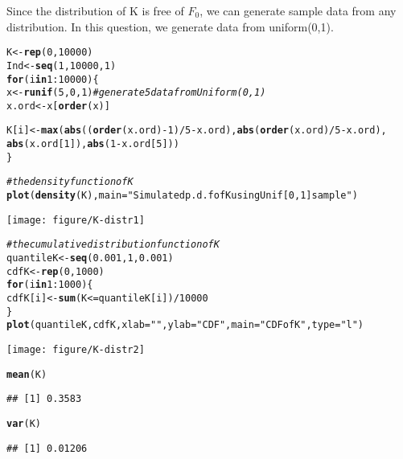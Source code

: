 \documentclass{article}\usepackage[]{graphicx}\usepackage[]{color}
\makeatletter
\newcommand{\hlnum}[1]{\textcolor[rgb]{0.686,0.059,0.569}{#1}}%
\newcommand{\hlstr}[1]{\textcolor[rgb]{0.192,0.494,0.8}{#1}}%
\newcommand{\hlcom}[1]{\textcolor[rgb]{0.678,0.584,0.686}{\textit{#1}}}%
\newcommand{\hlopt}[1]{\textcolor[rgb]{0,0,0}{#1}}%
\newcommand{\hlstd}[1]{\textcolor[rgb]{0.345,0.345,0.345}{#1}}%
\newcommand{\hlkwa}[1]{\textcolor[rgb]{0.161,0.373,0.58}{\textbf{#1}}}%
\newcommand{\hlkwb}[1]{\textcolor[rgb]{0.69,0.353,0.396}{#1}}%
\newcommand{\hlkwc}[1]{\textcolor[rgb]{0.333,0.667,0.333}{#1}}%
\newcommand{\hlkwd}[1]{\textcolor[rgb]{0.737,0.353,0.396}{\textbf{#1}}}%
\newenvironment{kframe}{%
 \def\at@end@of@kframe{}%
 \ifinner\ifhmode%
  \def\at@end@of@kframe{\end{minipage}}%
  \begin{minipage}{\columnwidth}%
 \fi\fi%
 \def\FrameCommand##1{\hskip\@totalleftmargin \hskip-\fboxsep
 \colorbox{shadecolor}{##1}\hskip-\fboxsep
     \hskip-\linewidth \hskip-\@totalleftmargin \hskip\columnwidth}%
 \MakeFramed {\advance\hsize-\width
   \@totalleftmargin\z@ \linewidth\hsize
   \@setminipage}}%
 {\par\unskip\endMakeFramed%
 \at@end@of@kframe}
\newenvironment{knitrout}{}{} %
\makeatother
\begin{document}
Since the distribution of K is free of $F_0$, we can generate sample data from any distribution. In this question, we generate data from uniform(0,1).
\begin{knitrout}
\color{fgcolor}\begin{kframe}
\begin{alltt}
\hlstd{K} \hlkwb{<-} \hlkwd{rep}\hlstd{(}\hlnum{0}\hlstd{,} \hlnum{10000}\hlstd{)}
\hlstd{Ind} \hlkwb{<-} \hlkwd{seq}\hlstd{(}\hlnum{1}\hlstd{,} \hlnum{10000}\hlstd{,} \hlnum{1}\hlstd{)}
\hlkwa{for} \hlstd{(i} \hlkwa{in} \hlnum{1}\hlopt{:}\hlnum{10000}\hlstd{) \{}
    \hlstd{x} \hlkwb{<-} \hlkwd{runif}\hlstd{(}\hlnum{5}\hlstd{,} \hlnum{0}\hlstd{,} \hlnum{1}\hlstd{)}  \hlcom{# generate 5 data from Uniform(0,1)}
    \hlstd{x.ord} \hlkwb{<-} \hlstd{x[}\hlkwd{order}\hlstd{(x)]}

    \hlstd{K[i]} \hlkwb{<-} \hlkwd{max}\hlstd{(}\hlkwd{abs}\hlstd{((}\hlkwd{order}\hlstd{(x.ord)} \hlopt{-} \hlnum{1}\hlstd{)}\hlopt{/}\hlnum{5} \hlopt{-} \hlstd{x.ord),} \hlkwd{abs}\hlstd{(}\hlkwd{order}\hlstd{(x.ord)}\hlopt{/}\hlnum{5} \hlopt{-} \hlstd{x.ord),}
        \hlkwd{abs}\hlstd{(x.ord[}\hlnum{1}\hlstd{]),} \hlkwd{abs}\hlstd{(}\hlnum{1} \hlopt{-} \hlstd{x.ord[}\hlnum{5}\hlstd{]))}
\hlstd{\}}

\hlcom{# the density function of K}
\hlkwd{plot}\hlstd{(}\hlkwd{density}\hlstd{(K),} \hlkwc{main} \hlstd{=} \hlstr{"Simulated p.d.f of K using Unif[0,1] sample"}\hlstd{)}
\end{alltt}
\end{kframe}
\texttt{[image: figure/K-distr1]} 
\begin{kframe}\begin{alltt}
\hlcom{# the cumulative distribution function of K}
\hlstd{quantileK} \hlkwb{<-} \hlkwd{seq}\hlstd{(}\hlnum{0.001}\hlstd{,} \hlnum{1}\hlstd{,} \hlnum{0.001}\hlstd{)}
\hlstd{cdfK} \hlkwb{<-} \hlkwd{rep}\hlstd{(}\hlnum{0}\hlstd{,} \hlnum{1000}\hlstd{)}
\hlkwa{for} \hlstd{(i} \hlkwa{in} \hlnum{1}\hlopt{:}\hlnum{1000}\hlstd{) \{}
    \hlstd{cdfK[i]} \hlkwb{<-} \hlkwd{sum}\hlstd{(K} \hlopt{<=} \hlstd{quantileK[i])}\hlopt{/}\hlnum{10000}
\hlstd{\}}
\hlkwd{plot}\hlstd{(quantileK, cdfK,} \hlkwc{xlab} \hlstd{=} \hlstr{""}\hlstd{,} \hlkwc{ylab} \hlstd{=} \hlstr{"CDF"}\hlstd{,} \hlkwc{main} \hlstd{=} \hlstr{"CDF of K"}\hlstd{,} \hlkwc{type} \hlstd{=} \hlstr{"l"}\hlstd{)}
\end{alltt}
\end{kframe}
\texttt{[image: figure/K-distr2]} 
\begin{kframe}\begin{alltt}
\hlkwd{mean}\hlstd{(K)}
\end{alltt}
\begin{verbatim}
## [1] 0.3583
\end{verbatim}
\begin{alltt}
\hlkwd{var}\hlstd{(K)}
\end{alltt}
\begin{verbatim}
## [1] 0.01206
\end{verbatim}
\end{kframe}
\end{knitrout}
\end{document}

